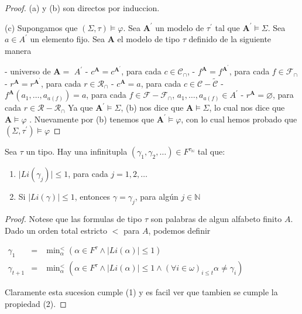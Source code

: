   \begin{proof}
    (a) y (b) son directos por induccion.

    (c) Supongamos que $(\Sigma, \tau)\models \varphi $. Sea $\mathbf{A} ^{\prime}$ un modelo de $\tau ^{\prime}$ tal que $\mathbf{A}^{\prime}\models \Sigma $. Sea $a\in A^{\prime}$ un elemento fijo. Sea $\mathbf{A}$ el modelo de tipo $\tau $ definido de la siguiente manera

    - universo de $\mathbf{A}=$ $A^{\prime}$
    - $c^{\mathbf{A}}=c^{\mathbf{A}^{\prime}}$, para cada $c\in \mathcal{ C}_{\cap }$,
    - $f^{\mathbf{A}}=f^{\mathbf{A}^{\prime}}$, para cada $f\in \mathcal{ F}_{\cap }$
    - $r^{\mathbf{A}}=r^{\mathbf{A}^{\prime}}$, para cada $r\in \mathcal{ R}_{\cap }$
    - $c^{\mathbf{A}}=a$, para cada $c\in \mathcal{C}-\widetilde{\mathcal{ C}}$
    - $f^{\mathbf{A}}(a_{1}, \dotsc, a_{a(f)})=a$, para cada $f\in \mathcal{F}- \mathcal{F}_{\cap }$, $a_{1}, \dotsc, a_{a(f)}\in A^{\prime}$
    - $r^{\mathbf{A}}=\varnothing $, para cada $r\in \mathcal{R-R}_{\cap }$
    Ya que $\mathbf{A}^{\prime}\models \Sigma $, (b) nos dice que $ \mathbf{A}\models \Sigma $, lo cual nos dice que $\mathbf{A}\models \varphi $ . Nuevamente por (b) tenemos que $\mathbf{A}^{\prime}\models \varphi $, con lo cual hemos probado que $(\Sigma ,\tau ^{\prime})\models \varphi $
  \end{proof}

  \begin{lemma} \label{lemma_81}
    \PN Sea $\tau$ un tipo. Hay una infinitupla $(\gamma_{1}, \gamma_{2}, \dotsc) \in F^{\tau_{\mathbb{N}}}$ tal que:
    \begin{enumerate}
      \item $\lvert Li(\gamma_{j}) \rvert \leq 1$, para cada $j = 1, 2, \dotsc$
      \item Si $\lvert Li(\gamma )\rvert \leq 1$, entonces $\gamma = \gamma_{j}$, para algún $j \in \mathbb{N}$
    \end{enumerate}
  \end{lemma}
  \begin{proof}
    Notese que las formulas de tipo $\tau $ son palabras de algun alfabeto finito $A$. Dado un orden total estricto $< $ para $A$, podemos definir

    $\displaystyle \begin{array}{rcl} \gamma _{1} & =& \min\nolimits_{\alpha }^{< }\left( \alpha \in F^{\tau }\wedge \lvert Li(\alpha )\rvert \leq 1\right) \\ \gamma _{t+1} & =& \min\nolimits_{\alpha }^{< }\left( \alpha \in F^{\tau }\wedge \lvert Li(\alpha )\rvert \leq 1\wedge (\forall i\in \omega )_{i\leq t}\alpha \neq \gamma _{i}\right) \end{array} $

    Claramente esta sucesion cumple (1) y es facil ver que tambien se cumple la propiedad (2).
  \end{proof}

